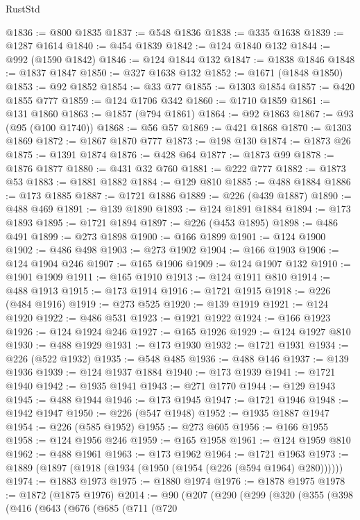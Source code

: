 \begin{lexlean}{RustStd}
\begin{coremodule}
{\begin{coremodule}
{{{{{{{{{{{{{{{{{{{{{{{{{{{{{{{{{{{{{@1836 := @800 @1835
@1837 := @548 @1836
@1838 := @335 @1638
@1839 := @1287 @1614
@1840 := @454 @1839
@1842 := @124 @1840 @132
@1844 := @992 (@1590 @1842)
@1846 := @124 @1844 @132
@1847 := @1838 @1846
@1848 := @1837 @1847
@1850 := @327 @1638 @132
@1852 := @1671 (@1848 @1850)
@1853 := @92 @1852
@1854 := @33 @77
@1855 := @1303 @1854
@1857 := @420 @1855 @777
@1859 := @124 @1706 @342
@1860 := @1710 @1859
@1861 := @131 @1860
@1863 := @1857 (@794 @1861)
@1864 := @92 @1863
@1867 := @93 (@95 (@100 @1740))
@1868 := @56 @57
@1869 := @421 @1868
@1870 := @1303 @1869
@1872 := @1867 @1870 @777
@1873 := @198 @130
@1874 := @1873 @26
@1875 := @1391 @1874
@1876 := @428 @64
@1877 := @1873 @99
@1878 := @1876 @1877
@1880 := @431 @32 @760
@1881 := @222 @777
@1882 := @1873 @53
@1883 := @1881 @1882
@1884 := @129 @810
@1885 := @488 @1884
@1886 := @173 @1885
@1887 := @1721 @1886
@1889 := @226 (@439 @1887)
@1890 := @488 @469
@1891 := @139 @1890
@1893 := @124 @1891 @1884
@1894 := @173 @1893
@1895 := @1721 @1894
@1897 := @226 (@453 @1895)
@1898 := @486 @491
@1899 := @273 @1898
@1900 := @166 @1899
@1901 := @124 @1900
@1902 := @486 @498
@1903 := @273 @1902
@1904 := @166 @1903
@1906 := @124 @1904 @246
@1907 := @165 @1906
@1909 := @124 @1907 @132
@1910 := @1901 @1909
@1911 := @165 @1910
@1913 := @124 @1911 @810
@1914 := @488 @1913
@1915 := @173 @1914
@1916 := @1721 @1915
@1918 := @226 (@484 @1916)
@1919 := @273 @525
@1920 := @139 @1919
@1921 := @124 @1920
@1922 := @486 @531
@1923 := @1921 @1922
@1924 := @166 @1923
@1926 := @124 @1924 @246
@1927 := @165 @1926
@1929 := @124 @1927 @810
@1930 := @488 @1929
@1931 := @173 @1930
@1932 := @1721 @1931
@1934 := @226 (@522 @1932)
@1935 := @548 @485
@1936 := @488 @146
@1937 := @139 @1936
@1939 := @124 @1937 @1884
@1940 := @173 @1939
@1941 := @1721 @1940
@1942 := @1935 @1941
@1943 := @271 @1770
@1944 := @129 @1943
@1945 := @488 @1944
@1946 := @173 @1945
@1947 := @1721 @1946
@1948 := @1942 @1947
@1950 := @226 (@547 @1948)
@1952 := @1935 @1887 @1947
@1954 := @226 (@585 @1952)
@1955 := @273 @605
@1956 := @166 @1955
@1958 := @124 @1956 @246
@1959 := @165 @1958
@1961 := @124 @1959 @810
@1962 := @488 @1961
@1963 := @173 @1962
@1964 := @1721 @1963
@1973 := @1889 (@1897 (@1918 (@1934 (@1950 (@1954 (@226 (@594 @1964) @280))))))
@1974 := @1883 @1973
@1975 := @1880 @1974
@1976 := @1878 @1975
@1978 := @1872 (@1875 @1976)
@2014 := @90
    (@207
      (@290
        (@299
          (@320
            (@355
              (@398
                (@416
                  (@643
                    (@676
                      (@685
                        (@711
                          (@720
}}}}}}}}}}}}}}}}}}}}}}}}}}}}}}}}}}}}}
\end{coremodule}}
\end{coremodule}
\end{lexlean}

